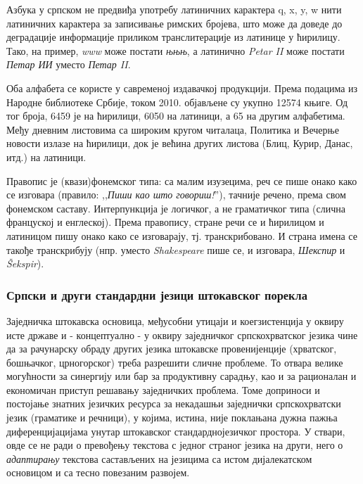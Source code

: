 \begin{multicols}{2}
Азбука у српском не предвиђа употребу латиничних карактера q, x, y, w нити латиничних карактера за записивање римских бројева, што може да доведе до деградације информације приликом транслитерације из латинице у ћирилицу. Тако, на пример, \textit{www} може постати \textit{њњњ}, а латинично \textit{Petar II} може постати \textit{Петар ИИ} уместо \textit{Петар II}. 

Оба алфабета се користе у савременој издавачкој продукцији. Према подацима из Народне библиотеке Србије, током 2010. објављене су укупно 12574 књиге. Од тог броја, 6459 је на ћирилици, 6050 на латиници, а 65 на другим алфабетима. Међу дневним листовима са широким кругом читалаца, Политика и Вечерње новости излазе на ћирилици, док је већина других листова (Блиц, Курир, Данас, итд.) на латиници. 

Правопис је (квази)фонемског типа: са малим изузецима, реч се пише онако како се изговара (правило: ,,\textit{Пиши као што говориш!}''), тачније речено, према свом фонемском саставу.
Интерпункција је логичког, а не граматичког типа (слична француској и енглеској).
Према правопису, стране речи се и ћирилицом и латиницом пишу онако како се изговарају, тј. транскрибовано. И страна имена се такође транскрибују (нпр. уместо \textit{Shakespeare} пише се, и изговара, \textit{Шекспир} и \textit{Šekspir}).

\subsubsection {Српски и други стандардни језици штокавског порекла}
  
Заједничка штокавска основица, међусобни утицаји и коегзистенција у оквиру исте државе и - концептуално - у оквиру заједничког српскохрватског језика чине да за рачунарску обраду других језика  штокавске провенијенције (хрватског, бошњачког, црногорског) треба разрешити сличне проблеме. То отвара велике могућности за синергију или бар за продуктивну сарадњу, као и за  рационалан и економичан приступ решавању заједничких проблема. Томе доприноси и постојање знатних језичких ресурса за некадашњи заједнички српскохрватски језик (граматике и речници), у којима, истина, није поклањана дуж\-на пажња диференцијацијама унутар штокавског стандарднојезичког простора. У ствари, овде се не ради о превођењу текстова с једног страног језика на други, него о \textit{адаптирању} текстова састављених на језицима са истом дијалекатском основицом и са тесно повезаним развојем. 


\end{multicols}
